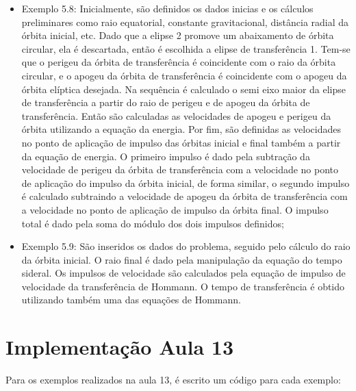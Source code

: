 \begin{itemize}
    \item Exemplo 5.8: Inicialmente, são definidos os dados inicias e os cálculos preliminares como raio equatorial, constante gravitacional, distância radial da órbita inicial, etc. Dado que a elipse 2 promove um abaixamento de órbita circular, ela é descartada, então é escolhida a elipse de transferência 1. Tem-se que o perigeu da órbita de transferência é coincidente com o raio da órbita circular, e o apogeu da órbita de transferência é coincidente com o apogeu da órbita elíptica desejada. Na sequência é calculado o semi eixo maior da elipse de transferência a partir do raio de perigeu e de apogeu da órbita de transferência. Então são calculadas as velocidades de apogeu e perigeu da órbita utilizando a equação da energia. Por fim, são definidas as velocidades no ponto de aplicação de impulso das órbitas inicial e final também a partir da equação de energia. O primeiro impulso é dado pela subtração da velocidade de perigeu da órbita de transferência com a velocidade no ponto de aplicação do impulso da órbita inicial, de forma similar, o segundo impulso é calculado subtraindo a velocidade de apogeu da órbita de transferência com a velocidade no ponto de aplicação de impulso da órbita final. O impulso total é dado pela soma do módulo dos dois impulsos definidos;

    \item Exemplo 5.9: São inseridos os dados do problema, seguido pelo cálculo do raio da órbita inicial. O raio final é dado pela manipulação da equação do tempo sideral. Os impulsos de velocidade são calculados pela equação de impulso de velocidade da transferência de Hommann. O tempo de transferência é obtido utilizando também uma das equações de Hommann.
\end{itemize}

\section{Implementação Aula 13}

Para os exemplos realizados na aula 13, é escrito um código para cada exemplo: 

